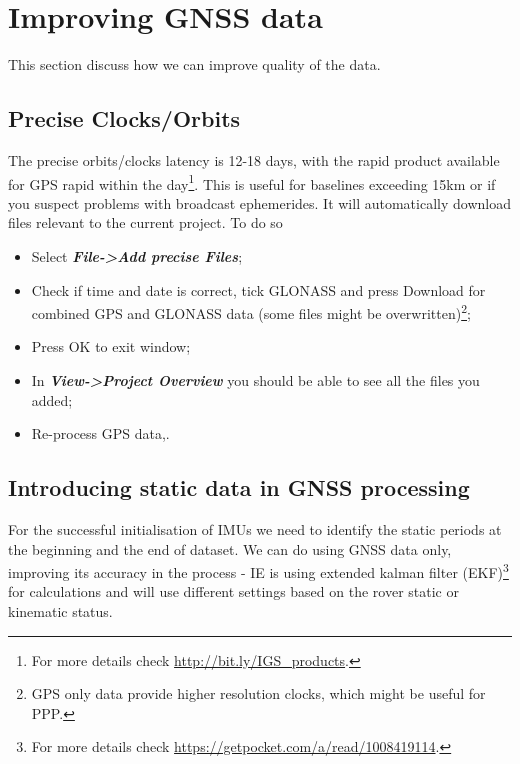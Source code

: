 \documentclass[british]{book}
\newcommand{\moreInfo}[1]{\footnote{For more details check \url{#1}.}}
\begin{document}



\section{Improving GNSS data}

This section discuss how we can improve quality of the data.


\subsection{Precise Clocks/Orbits}

The precise orbits/clocks latency is 12-18 days, with the rapid product available for GPS rapid within the day\moreInfo{http://bit.ly/IGS_products}. This is useful for baselines exceeding 15km or if you suspect problems with broadcast ephemerides. It will automatically download files relevant to the current project. To do so 

\begin{itemize}
	\item Select \textbf{\emph{File->Add precise Files}};
	\item Check if time and date is correct, tick GLONASS and press Download for combined GPS and GLONASS data (some files might be overwritten)\footnote{GPS only data provide higher resolution clocks, which might be useful for PPP.};
	\item Press OK to exit window;
	\item In \textbf{\emph{View->Project Overview}} you should be able to see all the files you added;
	\item Re-process GPS data,.
\end{itemize}


\subsection{Introducing static data in GNSS processing}

For the successful initialisation of IMUs we need to identify the static periods at the beginning and the end of dataset. We can do using GNSS data only, improving its accuracy in the process - IE is using extended kalman filter (EKF)\moreInfo{https://getpocket.com/a/read/1008419114} for calculations and will use different settings based on the rover static or kinematic status.
\end{document}
